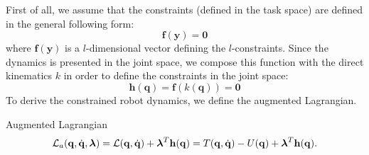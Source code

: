 \documentclass[10pt, a4paper]{report}
\newcommand{\y}{{\mathbf y}}
\newcommand{\q}{{\mathbf q}}
\begin{document}
First of all, we assume that the constraints (defined in the task space) are defined in the general following form:\begin{equation}
    \mathbf f(\mathbf y)=\mathbf 0
\end{equation}
where $\mathbf f(\y)$ is a $l$-dimensional vector defining the $l$-constraints.
Since the dynamics is presented in the joint space, we compose this function with the direct kinematics $k$ in order to define the constraints in the joint space:\begin{equation}
   \mathbf h(\q)=\mathbf f(k(\q))=\mathbf 0
\end{equation}
To derive the constrained robot dynamics, we define the augmented Lagrangian.
\begin{boxdefinition}{Augmented Lagrangian}{}
    \begin{equation}
    \mathcal L_a(\q,\dq,\boldsymbol{\lambda})=\mathcal L(\q,\dq)+\boldsymbol{\lambda}^T\mathbf h(\q)=T(\q,\dq)-U(\q)+\boldsymbol{\lambda}^T\mathbf h(\q).
\end{equation}
\end{boxdefinition}
\end{document}
